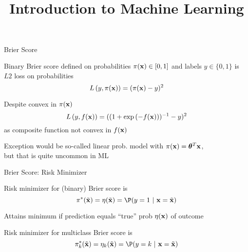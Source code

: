 \documentclass[11pt,compress,t,notes=noshow, xcolor=table]{beamer}
\title{Introduction to Machine Learning}
\begin{document}
    


\begin{framei}[fs=footnotesize,sep=M]{Brier Score}

\item Binary Brier score defined on probabilities $\pi(\mathbf{x}) \in [0, 1]$ and labels $y \in \{0, 1\}$ is $L2$ loss on probabilities $$L\left(y, \pi(\mathbf{x})\right) = (\pi(\mathbf{x}) - y)^2$$
\item Despite convex in $\pi(\mathbf{x})$ $$L\left(y, f(\mathbf{x})\right)=((1+\exp{(-f(\mathbf{x}))})^{-1}-y)^2$$ as composite function not convex in $f(\mathbf{x})$
\item Exception would be so-called linear prob. model with $\pi(\mathbf{x}) = \bm{\theta}^T \mathbf{x}$,\\
but that is quite uncommon in ML 

% 
% 

\vfill 


\end{framei}

\begin{framei}[sep=L]{Brier Score: Risk Minimizer}

    \item Risk minimizer for (binary) Brier score is $$\piastxtil = \eta(\xtil) = \P(y=1~|~\xv = \xtil)$$
    \item Attains minimum if prediction equals \enquote{true} prob $\eta(\mathbf{x})$ of outcome
    \item Risk minimizer for multiclass Brier score is 
$$\pi^{\ast}_k(\xtil) = \eta_k(\xtil) =  \P(y = k ~|~ \xv = \xtil) $$

\end{framei}
\end{document}
